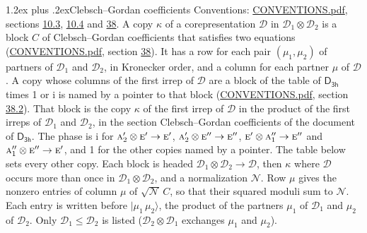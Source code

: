 \documentclass[10pt,a4paper]{article}
\makeatletter
\renewcommand\section{\@startsection{section}{1}{\z@}{-3ex plus -1ex minus -.2ex}%
  {1.2ex plus .2ex}{\normalfont\large\sffamily\bfseries\color{parttitle}}}
\numberwithin{equation}{section}
\newcommand{\grp}[1]{\mathsf{#1}}
\newcommand{\irr}[1]{\text{\normalfont\scshape #1}}
\newcommand{\iunit}{\mathrm{i}}
\newcommand{\irrprod}{\otimes}
\newcommand{\mult}{\kappa}
\newcommand{\intx}{\mu}
\newcommand{\cgnorm}{\mathcal{N}}
\newcommand{\prodket}[2]{\lvert {#1}\,{#2}\rangle}
\makeatother
\begin{document}
\section{Clebsch--Gordan coefficients}\label{s:clebsch_gordan}
Conventions: \href{../../CONVENTIONS.pdf}{CONVENTIONS.pdf}, sections \href{../../../rotation/CONVENTIONS.pdf\#conv.10.3}{10.3}, \href{../../../rotation/CONVENTIONS.pdf\#conv.10.4}{10.4} and \href{../../CONVENTIONS.pdf\#conv.38}{38}.
\leavevmode\label{n:index.copy}\label{n:matrix.cg.stored}A copy $\mult$ of a corepresentation $\mathcal{D}$ in $\mathcal{D}_1\irrprod\mathcal{D}_2$ is a block $C$ of Clebsch--Gordan coefficients that satisfies two equations (\href{../../CONVENTIONS.pdf}{CONVENTIONS.pdf}, section \href{../../CONVENTIONS.pdf\#conv.38}{38}). \label{n:index.cg}It has a row for each pair $(\intx_1, \intx_2)$ of partners of $\mathcal{D}_1$ and $\mathcal{D}_2$, in Kronecker order, and a column for each partner $\intx$ of $\mathcal{D}$.
A copy whose columns of the first irrep of $\mathcal{D}$ are a block of the table of $\grp{D_{3h}}$ times 1 or $\iunit$ is named by a pointer to that block (\href{../../CONVENTIONS.pdf}{CONVENTIONS.pdf}, section \href{../../CONVENTIONS.pdf\#conv.38.2}{38.2}). That block is the copy $\mult$ of the first irrep of $\mathcal{D}$ in the product of the first irreps of $\mathcal{D}_1$ and $\mathcal{D}_2$, in the section Clebsch--Gordan coefficients of the document of \href{../../../rotation/data/pdf/D3h.pdf}{$\grp{D_{3h}}$}. The phase is $\iunit$ for $\irr{a}_{2}'\irrprod \irr{e}'\to \irr{e}'$, $\irr{a}_{2}'\irrprod \irr{e}''\to \irr{e}''$, $\irr{e}'\irrprod \irr{a}_{1}''\to \irr{e}''$ and $\irr{a}_{1}''\irrprod \irr{e}''\to \irr{e}'$, and 1 for the other copies named by a pointer. The table below sets every other copy.
Each block is headed $\mathcal{D}_1\irrprod\mathcal{D}_2\to\mathcal{D}$, then $\mult$ where $\mathcal{D}$ occurs more than once in $\mathcal{D}_1\irrprod\mathcal{D}_2$, and a normalization $\cgnorm$. Row $\intx$ gives the nonzero entries of column $\intx$ of $\sqrt{\cgnorm}\,C$, so that their squared moduli sum to $\cgnorm$. \label{n:vector.ket.product}Each entry is written before $\prodket{\intx_1}{\intx_2}$, the product of the partners $\intx_1$ of $\mathcal{D}_1$ and $\intx_2$ of $\mathcal{D}_2$. Only $\mathcal{D}_1 \le \mathcal{D}_2$ is listed ($\mathcal{D}_2\irrprod\mathcal{D}_1$ exchanges $\intx_1$ and $\intx_2$).
\end{document}
